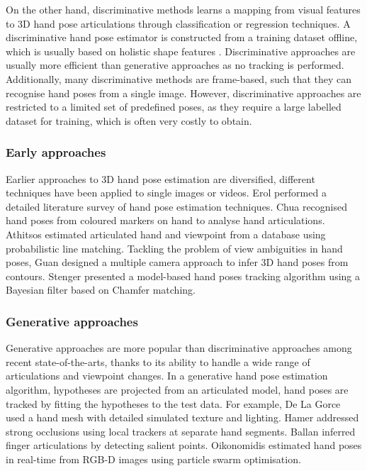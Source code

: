 On the other hand, discriminative methods learns a mapping from visual features to 3D hand pose articulations through classification or regression techniques. A discriminative hand pose estimator is constructed from a training dataset offline, which is usually based on holistic shape features \cite{Rosales2001, Athitsos2003, Romero2009, Wang2009, Keskin2012}. Discriminative approaches are usually more efficient than generative approaches as no tracking is performed. Additionally, many discriminative methods are frame-based, such that they can recognise hand poses from a single image. However, discriminative approaches are restricted to a limited set of predefined poses, as they require a large labelled dataset for training, which is often very costly to obtain.  

\subsubsection{Early approaches} 
Earlier approaches to 3D hand pose estimation are diversified, different techniques have been applied to single images or videos. Erol \etal \cite{Erol2007} performed a detailed literature survey of hand pose estimation techniques. Chua \etal \cite{Chua2002} recognised hand poses from coloured markers on hand to analyse hand articulations. Athitsos \etal \cite{Athitsos2003} estimated articulated hand and viewpoint from a database using probabilistic line matching. Tackling the problem of view ambiguities in hand poses, Guan \etal \cite{Guan2006} designed a multiple camera approach to infer 3D hand poses from contours. Stenger \etal \cite{Stenger2006} presented a model-based hand poses tracking algorithm using a Bayesian filter based on Chamfer matching.  

\subsubsection{Generative approaches} 
Generative approaches are more popular than discriminative approaches among recent state-of-the-arts, thanks to its ability to handle a wide range of articulations and viewpoint changes.   
In a generative hand pose estimation algorithm, hypotheses are projected from an articulated model, hand poses are tracked by fitting the hypotheses to the test data. 
For example, De La Gorce \etal \cite{LaGorce2011} used a hand mesh with detailed simulated texture and lighting. 
Hamer \etal \cite{Hamer2009} addressed strong occlusions using local trackers at separate hand segments. 
Ballan \etal \cite{Ballan2012} inferred finger articulations by detecting salient points.  
Oikonomidis \etal \cite{Oikonomidis2011} estimated hand poses in real-time from RGB-D images using particle swarm optimisation. 

